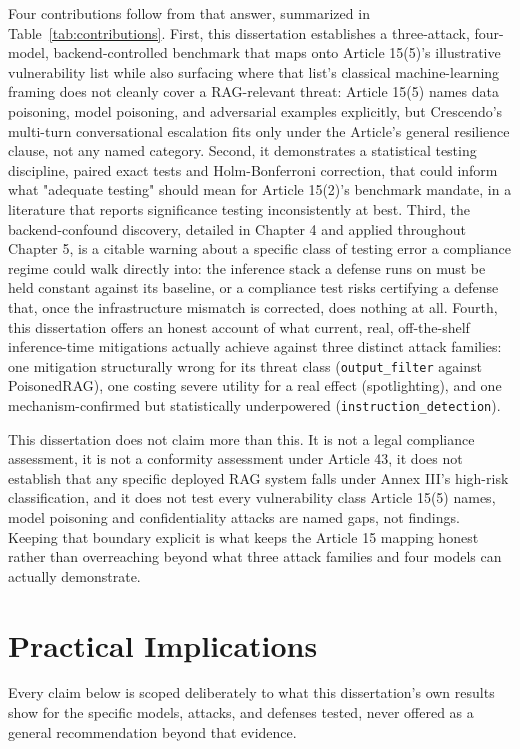 Four contributions follow from that answer, summarized in
Table~\ref{tab:contributions}. First, this dissertation establishes a
three-attack, four-model, backend-controlled benchmark that maps onto
Article 15(5)'s illustrative vulnerability list while also surfacing
where that list's classical machine-learning framing does not cleanly
cover a RAG-relevant threat: Article 15(5) names data poisoning, model
poisoning, and adversarial examples explicitly, but Crescendo's
multi-turn conversational escalation fits only under the Article's
general resilience clause, not any named category. Second, it
demonstrates a statistical testing discipline, paired exact tests and
Holm-Bonferroni correction, that could inform what "adequate testing"
should mean for Article 15(2)'s benchmark mandate, in a literature that
reports significance testing inconsistently at best. Third, the
backend-confound discovery, detailed in Chapter 4 and applied throughout
Chapter 5, is a citable warning about a specific class of testing error
a compliance regime could walk directly into: the inference stack a
defense runs on must be held constant against its baseline, or a
compliance test risks certifying a defense that, once the infrastructure
mismatch is corrected, does nothing at all. Fourth, this dissertation
offers an honest account of what current, real, off-the-shelf
inference-time mitigations actually achieve against three distinct
attack families: one mitigation structurally wrong for its threat class
(\texttt{output\_filter} against PoisonedRAG), one costing severe
utility for a real effect (spotlighting), and one mechanism-confirmed
but statistically underpowered (\texttt{instruction\_detection}).

This dissertation does not claim more than this. It is not a legal
compliance assessment, it is not a conformity assessment under Article
43, it does not establish that any specific deployed RAG system falls
under Annex III's high-risk classification, and it does not test every
vulnerability class Article 15(5) names, model poisoning and
confidentiality attacks are named gaps, not findings. Keeping that
boundary explicit is what keeps the Article 15 mapping honest rather
than overreaching beyond what three attack families and four models can
actually demonstrate.

\section{Practical Implications}

Every claim below is scoped deliberately to what this dissertation's own
results show for the specific models, attacks, and defenses tested,
never offered as a general recommendation beyond that evidence.

